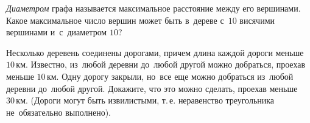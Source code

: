 \begin{problems}
\item
\emph{Диаметром} графа называется максимальное расстояние между его вершинами.
Какое максимальное число вершин может быть в~дереве с~$10$ висячими вершинами
и~с~диаметром $10$?

\item
Несколько деревень соединены дорогами, причем длина каждой дороги меньше
$10\,\text{км}$.
Известно, из~любой деревни до~любой другой можно добраться, проехав меньше
$10\,\text{км}$.
Одну дорогу закрыли, но~все еще можно добраться из~любой деревни до~любой
другой.
Докажите, что это можно сделать, проехав меньше $30\,\text{км}$.
(Дороги могут быть извилистыми, т.\,е. неравенство треугольника не~обязательно
выполнено).

\end{problems}


